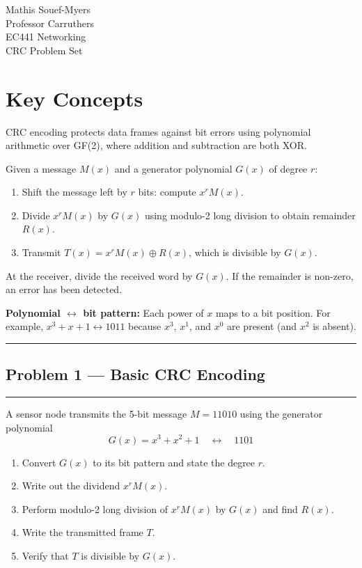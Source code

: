 \documentclass[12pt]{article}
\begin{document}
\noindent Mathis Souef-Myers\\
Professor Carruthers\\
EC441 Networking\\
CRC Problem Set

\bigskip

\section*{Key Concepts}

CRC encoding protects data frames against bit errors using polynomial arithmetic over GF(2), where addition and subtraction are both XOR.

Given a message $M(x)$ and a generator polynomial $G(x)$ of degree $r$:
\begin{enumerate}
  \item Shift the message left by $r$ bits: compute $x^r M(x)$.
  \item Divide $x^r M(x)$ by $G(x)$ using modulo-2 long division to obtain remainder $R(x)$.
  \item Transmit $T(x) = x^r M(x) \oplus R(x)$, which is divisible by $G(x)$.
\end{enumerate}

At the receiver, divide the received word by $G(x)$. If the remainder is non-zero, an error has been detected.

\textbf{Polynomial $\leftrightarrow$ bit pattern:} Each power of $x$ maps to a bit position. For example, $x^3 + x + 1 \leftrightarrow 1011$ because $x^3$, $x^1$, and $x^0$ are present (and $x^2$ is absent).

\bigskip
\hrule
\bigskip

\subsection*{Problem 1 --- Basic CRC Encoding}
\hrule\medskip
A sensor node transmits the 5-bit message $M = 11010$ using the generator polynomial
\[
  G(x) = x^3 + x^2 + 1 \quad \longleftrightarrow \quad 1101
\]
\begin{enumerate}[label=(\alph*)]
  \item Convert $G(x)$ to its bit pattern and state the degree $r$.
  \item Write out the dividend $x^r M(x)$.
  \item Perform modulo-2 long division of $x^r M(x)$ by $G(x)$ and find $R(x)$.
  \item Write the transmitted frame $T$.
  \item Verify that $T$ is divisible by $G(x)$.
\end{enumerate}
\bigskip
\end{document}
